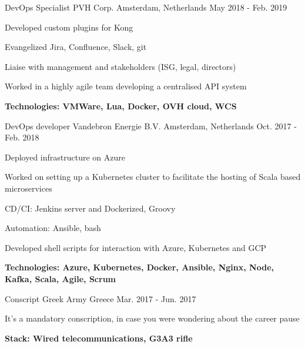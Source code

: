 \begin{cventries}
\cventry
{DevOps Specialist} %
{PVH Corp.} %
{Amsterdam, Netherlands} %
{May 2018 - Feb. 2019} %
{ %
	\begin{cvitems}
		\item {Developed custom plugins for Kong}
		\item {Evangelized Jira, Confluence, Slack, git}
		\item {Liaise with management and stakeholders (ISG, legal, directors)}
		\item {Worked in a highly agile team developing a centralised API system}
		\item {\bfseries{Technologies:} VMWare, Lua, Docker, OVH cloud, WCS}
	\end{cvitems}
}


\cventry
{DevOps developer} %
{Vandebron Energie B.V.} %
{Amsterdam, Netherlands} %
{Oct. 2017 - Feb. 2018} %
{ %
\begin{cvitems}
\item {Deployed infrastructure on Azure}
\item {Worked on setting up a Kubernetes cluster to facilitate the hosting of Scala based microservices}
\item {CD/CI: Jenkins server and Dockerized, Groovy}
\item {Automation: Ansible, bash}
\item {Developed shell scripts for interaction with Azure, Kubernetes and GCP}
\item {\bfseries{Technologies:} Azure, Kubernetes, Docker, Ansible, Nginx, Node, Kafka, Scala, Agile, Scrum}
\end{cvitems}
}


\cventry
{Conscript} %
{Greek Army} %
{Greece} %
{Mar. 2017 - Jun. 2017} %
{ %
\begin{cvitems}
\item {It's a mandatory conscription, in case you were wondering about the career pause}
\item {\bfseries{Stack:} Wired telecommunications, G3A3 rifle}
\end{cvitems}
}



\end{cventries}
